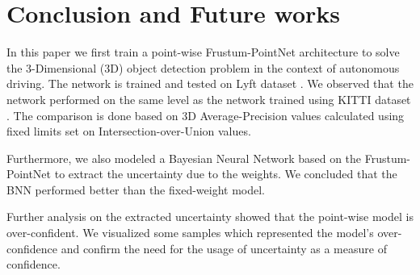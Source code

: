 \documentclass[10pt,twocolumn,letterpaper]{article}
\begin{document}
\section{Conclusion and Future works}
In this paper we first train a point-wise Frustum-PointNet \cite{FPointnet2018} architecture to solve the 3-Dimensional (3D) object detection problem in the context of autonomous driving. The network is trained and tested on Lyft dataset \cite{Lyft2019}. We observed that the network performed on the same level as the network trained using KITTI dataset \cite{KITTI2012}. The comparison is done based on 3D Average-Precision values calculated using fixed limits set on Intersection-over-Union values.
    
Furthermore, we also modeled a Bayesian Neural Network based on the Frustum-PointNet \cite{FPointnet2018} to extract the uncertainty due to the weights. We concluded that the BNN performed better than the fixed-weight model.

Further analysis on the extracted uncertainty showed that the point-wise model is over-confident. We visualized some samples which represented the model's over-confidence and confirm the need for the usage of uncertainty as a measure of confidence.


{\small


}
\end{document}
